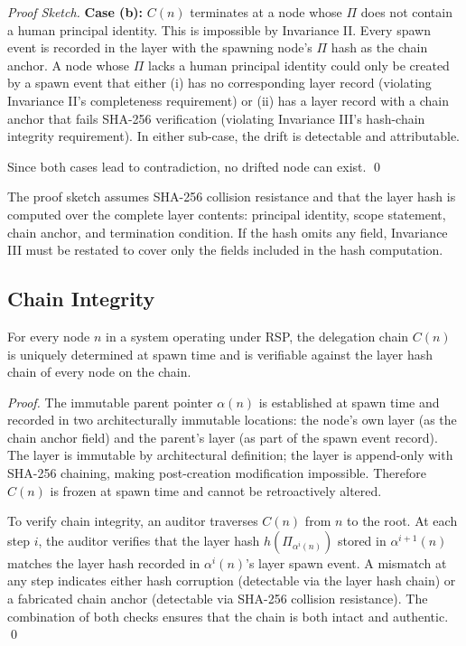 \begin{proof}[Proof Sketch]
\textbf{Case (b):} $C(n)$ terminates at a node whose $\Pi$ does not contain a human principal identity. This is impossible by Invariance II. Every spawn event is recorded in the \fact layer with the spawning node's $\Pi$ hash as the chain anchor. A node whose $\Pi$ lacks a human principal identity could only be created by a spawn event that either (i) has no corresponding \fact layer record (violating Invariance II's completeness requirement) or (ii) has a \fact layer record with a chain anchor that fails SHA-256 verification (violating Invariance III's hash-chain integrity requirement). In either sub-case, the drift is detectable and attributable.

Since both cases lead to contradiction, no drifted node can exist. \qed
\end{proof}

\begin{rem}
The proof sketch assumes SHA-256 collision resistance and that the \purpose layer hash is computed over the complete layer contents: principal identity, scope statement, chain anchor, and termination condition. If the hash omits any field, Invariance III must be restated to cover only the fields included in the hash computation.
\end{rem}

\subsection{Chain Integrity}

\begin{thrm}
\label{thrm:chain-integrity}
For every node $n$ in a \bxthree system operating under RSP, the delegation chain $C(n)$ is uniquely determined at spawn time and is verifiable against the \fact layer hash chain of every node on the chain.
\end{thrm}

\begin{proof}
The immutable parent pointer $\alpha(n)$ is established at spawn time and recorded in two architecturally immutable locations: the node's own \purpose layer (as the chain anchor field) and the parent's \fact layer (as part of the spawn event record). The \purpose layer is immutable by architectural definition; the \fact layer is append-only with SHA-256 chaining, making post-creation modification impossible. Therefore $C(n)$ is frozen at spawn time and cannot be retroactively altered.

To verify chain integrity, an auditor traverses $C(n)$ from $n$ to the root. At each step $i$, the auditor verifies that the \purpose layer hash $h(\Pi_{\alpha^i(n)})$ stored in $\alpha^{i+1}(n)$ matches the \purpose layer hash recorded in $\alpha^i(n)$'s \fact layer spawn event. A mismatch at any step indicates either hash corruption (detectable via the \fact layer hash chain) or a fabricated chain anchor (detectable via SHA-256 collision resistance). The combination of both checks ensures that the chain is both intact and authentic. \qed
\end{proof}

